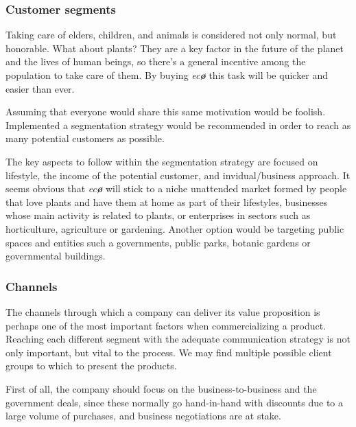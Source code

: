 \documentclass[english,runningheads,a4paper]{llncs}[2018/03/10]
\begin{document}

        \subsubsection*{Customer segments}

        Taking care of elders, children, and animals is considered not only
        normal, but honorable. What about plants? They are a key factor in the
        future of the planet and the lives of human beings, so there's a general
        incentive among the population to take care of them. By buying
        \textit{ec\textbf{\o}} this task will be quicker and easier than ever.

        Assuming that everyone would share this same motivation would be
        foolish. Implemented a segmentation strategy would be recommended in
        order to reach as many potential customers as possible.
    
        The key aspects to follow within the segmentation strategy are focused
        on lifestyle, the income of the potential customer, and
        invidual/business approach. It seems obvious that \textit{ec\textbf{\o}}
        will stick to a niche unattended market formed by people that love
        plants and have them at home as part of their lifestyles, businesses
        whose main activity is related to plants, or enterprises in sectors such
        as horticulture, agriculture or gardening. Another option would be
        targeting public spaces and entities such a governments, public parks,
        botanic gardens or governmental buildings.


        \subsubsection*{Channels}
        
        The channels through which a company can deliver its value proposition
        is perhaps one of the most important factors when commercializing a
        product. Reaching each different segment with the adequate communication
        strategy is not only important, but vital to the process. We may find
        multiple possible client groups to which to present the products.
       

        First of all, the company should focus on the business-to-business and
        the government deals, since these normally go hand-in-hand with
        discounts due to a large volume of purchases, and business negotiations
        are at stake.
\end{document}
